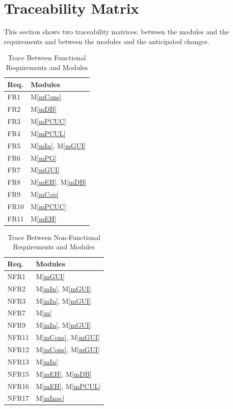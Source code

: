 \documentclass[12pt, titlepage]{article}
\newcommand{\mref}[1]{M\ref{#1}}
\begin{document}
\section{Traceability Matrix} \label{SecTM}

This section shows two traceability matrices: between the modules and the
requirements and between the modules and the anticipated changes.

\begin{table}[H]
\centering
\begin{tabular}{p{} p{}}
\toprule
\textbf{Req.} & \textbf{Modules}\\
\midrule
FR1 & \mref{mCons}\\
FR2 & \mref{mDB}\\
FR3 & \mref{mPCUC}\\
FR4 & \mref{mPCUL}\\
FR5 & \mref{mIn}, \mref{mGUI}\\
FR6 & \mref{mPG}\\
FR7 & \mref{mGUI}\\
FR8 & \mref{mEH}, \mref{mDB}\\
FR9 & \mref{mCop}\\
FR10 & \mref{mPCUC}\\
FR11 & \mref{mEH}\\
\bottomrule
\end{tabular}
\caption{Trace Between Functional Requirements and Modules}
\label{TblRT}
\end{table}

\begin{table}[H]
\centering
\begin{tabular}{p{} p{}}
\toprule
\textbf{Req.} & \textbf{Modules}\\
\midrule
NFR1 & \mref{mGUI}\\
NFR2 & \mref{mIn}, \mref{mGUI}\\
NFR3 & \mref{mIn}, \mref{mGUI}\\
NFR7 & \mref{m}\\
NFR9 & \mref{mIn}, \mref{mGUI}\\
NFR11 & \mref{mCons}, \mref{mGUI}\\
NFR12 & \mref{mCons}, \mref{mGUI}\\
NFR13 & \mref{mIn}\\
NFR15 & \mref{mEH}, \mref{mDB}\\
NFR16 & \mref{mEH}, \mref{mPCUL}\\
NFR17 & \mref{mInac}\\
\bottomrule
\end{tabular}
\caption{Trace Between Non-Functional Requirements and Modules}
\label{TblRT}
\end{table}
\end{document}
